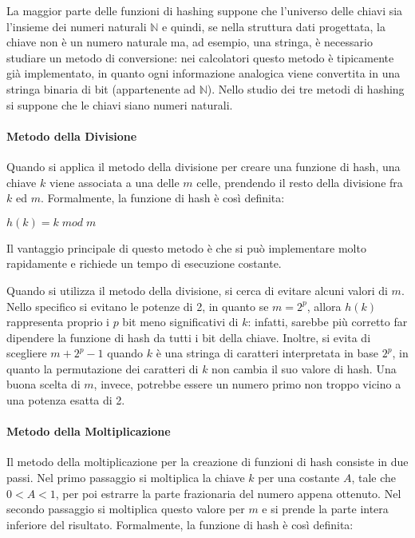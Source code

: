 La maggior parte delle funzioni di hashing suppone che l'universo delle chiavi sia l'insieme dei numeri naturali \(\mathbb{N}\) e quindi, se nella struttura dati progettata, la chiave non è un numero naturale ma, ad esempio, una stringa, è necessario studiare un metodo di conversione: nei calcolatori questo metodo è tipicamente già implementato, in quanto ogni informazione analogica viene convertita in una stringa binaria di bit (appartenente ad \(\mathbb{N}\)). Nello studio dei tre metodi di hashing si suppone che le chiavi siano numeri naturali.

\paragraph{Metodo della Divisione} Quando si applica il metodo della divisione per creare una funzione di hash, una chiave \(k\) viene associata a una delle \(m\) celle, prendendo il resto della divisione fra \(k\) ed \(m\). Formalmente, la funzione di hash è così definita:

\(h(k)=k\; mod\; m\)

\noindent Il vantaggio principale di questo metodo è che si può implementare molto rapidamente e richiede un tempo di esecuzione costante. 

Quando si utilizza il metodo della divisione, si cerca di evitare alcuni valori di \(m\). Nello specifico si evitano le potenze di 2, in quanto se \(m=2^p\), allora \(h(k)\) rappresenta proprio i \(p\) bit meno significativi di \(k\): infatti, sarebbe più corretto far dipendere la funzione di hash da tutti i bit della chiave. Inoltre, si evita di scegliere \(m+2^p-1\) quando \(k\) è una stringa di caratteri interpretata in base \(2^p\), in quanto la permutazione dei caratteri di \(k\) non cambia il suo valore di hash. Una buona scelta di \(m\), invece, potrebbe essere un numero primo non troppo vicino a una potenza esatta di 2.

\paragraph{Metodo della Moltiplicazione} Il metodo della moltiplicazione per la creazione di funzioni di hash consiste in due passi. Nel primo passaggio si moltiplica la chiave \(k\) per una costante \(A\), tale che \(0<A<1\), per poi estrarre la parte frazionaria del numero appena ottenuto. Nel secondo passaggio si moltiplica questo valore per \(m\) e si prende la parte intera inferiore del risultato. Formalmente, la funzione di hash è così definita:

